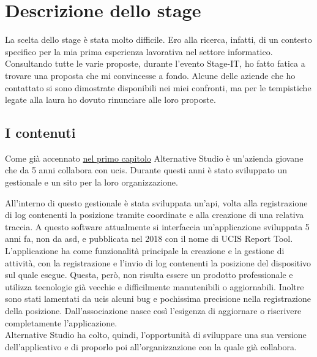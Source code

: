 \section{Descrizione dello stage}

La scelta dello stage è stata molto difficile. Ero alla ricerca, infatti, di un contesto specifico per la mia prima esperienza lavorativa
nel settore informatico. Consultando tutte le varie proposte, durante l'evento Stage-IT, ho fatto fatica a trovare una proposta che mi
convincesse a fondo. Alcune delle aziende che ho contattato si sono dimostrate disponibili nei miei confronti, ma per le
tempistiche legate alla laura ho dovuto rinunciare alle loro proposte.

\subsection{I contenuti}

Come già accennato {\hyperref[cap:introduzione]{nel primo capitolo}} Alternative Studio è un'azienda giovane che da 5 anni collabora con
\gls{ucis}. Durante questi anni è stato sviluppato un gestionale e un sito per la loro organizzazione.


All'interno di questo gestionale è stata sviluppata un'\acrshort{api}, volta alla registrazione di log contenenti la posizione tramite
coordinate e alla creazione di una relativa traccia. A questo software attualmente si interfaccia un'applicazione sviluppata 5 anni fa, non
da \acrlong{asd}, e pubblicata nel 2018 con il nome di UCIS Report Tool. L'applicazione ha come funzionalità principale la creazione e la
gestione di attività, con la registrazione e l'invio di log contenenti la posizione del dispositivo sul quale esegue. Questa, però, non
risulta essere un prodotto professionale e utilizza tecnologie già vecchie e difficilmente manutenibili o aggiornabili. Inoltre sono stati
lamentati da \gls{ucis} alcuni bug e pochissima precisione nella registrazione della posizione. Dall'associazione nasce così l'esigenza di aggiornare
o riscrivere completamente l'applicazione. \\
\noindent Alternative Studio ha colto, quindi, l'opportunità di sviluppare una sua versione dell'applicativo e di proporlo poi all'organizzazione con la quale già collabora.

